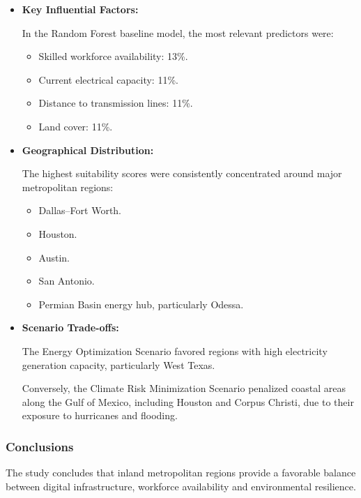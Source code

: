 \begin{itemize}

    \item \textbf{Key Influential Factors:}

    In the Random Forest baseline model, the most relevant predictors were:

    \begin{itemize}
        \item Skilled workforce availability: 13\%.
        \item Current electrical capacity: 11\%.
        \item Distance to transmission lines: 11\%.
        \item Land cover: 11\%.
    \end{itemize}

    \item \textbf{Geographical Distribution:}

    The highest suitability scores were consistently concentrated around major metropolitan regions:

    \begin{itemize}
        \item Dallas--Fort Worth.
        \item Houston.
        \item Austin.
        \item San Antonio.
        \item Permian Basin energy hub, particularly Odessa.
    \end{itemize}

    \item \textbf{Scenario Trade-offs:}

    The Energy Optimization Scenario favored regions with high electricity generation capacity, particularly West Texas.

    Conversely, the Climate Risk Minimization Scenario penalized coastal areas along the Gulf of Mexico, including Houston and Corpus Christi, due to their exposure to hurricanes and flooding.

\end{itemize}

\subsubsection{Conclusions}

The study concludes that inland metropolitan regions provide a favorable balance between digital infrastructure, workforce availability and environmental resilience.

